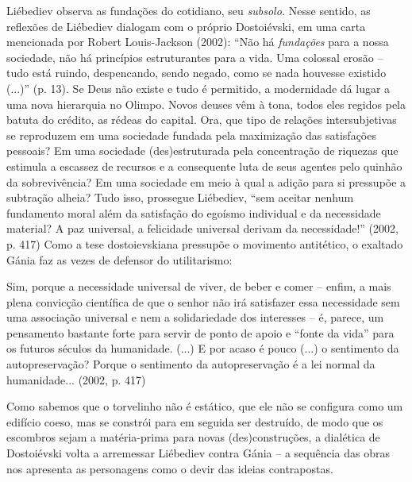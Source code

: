 Liébediev observa as fundações do cotidiano, seu \emph{subsolo.} Nesse
sentido, as reflexões de Liébediev dialogam com o próprio Dostoiévski,
em uma carta mencionada por Robert Louis-Jackson (2002): ``Não há
\emph{fundações} para a nossa sociedade, não há princípios estruturantes
para a vida. Uma colossal erosão -- tudo está ruindo, despencando, sendo
negado, como se nada houvesse existido (...)'' (p. 13). Se Deus não
existe e tudo é permitido, a modernidade dá lugar a uma nova hierarquia
no Olimpo. Novos deuses vêm à tona, todos eles regidos pela batuta do
crédito, as rédeas do capital. Ora, que tipo de relações intersubjetivas
se reproduzem em uma sociedade fundada pela maximização das satisfações
pessoais? Em uma sociedade (des)estruturada pela concentração de
riquezas que estimula a escassez de recursos e a consequente luta de
seus agentes pelo quinhão da sobrevivência? Em uma sociedade em meio à
qual a adição para si pressupõe a subtração alheia? Tudo isso, prossegue
Liébediev, ``sem aceitar nenhum fundamento moral além da satisfação do
egoísmo individual e da necessidade material? A paz universal, a
felicidade universal derivam da necessidade!'' (2002, p. 417) Como a
tese dostoievskiana pressupõe o movimento antitético, o exaltado Gánia
faz as vezes de defensor do utilitarismo:

Sim, porque a necessidade universal de viver, de beber e comer -- enfim,
a mais plena convicção científica de que o senhor não irá satisfazer
essa necessidade sem uma associação universal e nem a solidariedade dos
interesses -- é, parece, um pensamento bastante forte para servir de
ponto de apoio e ``fonte da vida'' para os futuros séculos da
humanidade. (...) E por acaso é pouco (...) o sentimento da
autopreservação? Porque o sentimento da autopreservação é a lei normal
da humanidade... (2002, p. 417)

Como sabemos que o torvelinho não é estático, que ele não se configura
como um edifício coeso, mas se constrói para em seguida ser destruído,
de modo que os escombros sejam a matéria-prima para novas
(des)construções, a dialética de Dostoiévski volta a arremessar
Liébediev contra Gánia -- a sequência das obras nos apresenta as
personagens como o devir das ideias contrapostas.

